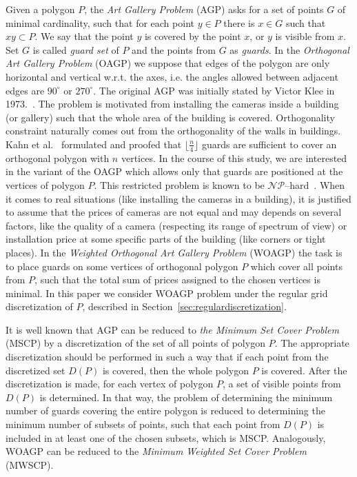\documentclass[runningheads,a4paper]{elsarticle}
\begin{document}
	Given a polygon $P$, the \emph{Art Gallery Problem} (AGP) asks for a set of points $G$ of minimal cardinality,  such that for each point $y \in P$ there is $x \in G$ such that $xy \subset P$. We say that the point $y$ is covered by the point $x$, or $y$ is visible from $x$. Set $G$ is called \emph{guard set} of $P$ and the points from $G$ as \emph{guards}. In the \emph{Orthogonal Art Gallery Problem} (OAGP) we suppose that edges of the polygon are only horizontal and vertical w.r.t. the axes, i.e.  the angles allowed between adjacent edges are  $90^{\circ}$ or $270^{\circ}$. The original AGP was initially stated by Victor  Klee in 1973.~\cite{o1987art}.  The problem is motivated from installing the cameras inside a building (or gallery) such that the whole area of the building is covered. Orthogonality constraint naturally comes out from the orthogonality of the walls in buildings. Kahn et al.~\cite{kahn1983traditional} formulated and proofed that 	$\lfloor \frac{n}{4} \rfloor$ guards are  sufficient to cover an orthogonal polygon with $n$ vertices.      In the course of this study, we are interested in the variant of the OAGP which allows only that guards are positioned at the vertices of polygon $P$. This restricted problem is known to be $\mathcal{NP}$--hard~\cite{katz2008guarding,schuchardt1995two}.  When it comes to real situations (like installing the cameras in a building), it is justified to assume that the prices of cameras are not equal and may depends on several factors, like the quality of a camera   (respecting its range of spectrum of view)  or installation price at some specific parts of the building (like corners or tight places).  In the \emph{Weighted Orthogonal Art Gallery Problem} (WOAGP) the task is to place guards on some vertices of orthogonal polygon $P$ which cover all points from $P$, such that the total sum of prices assigned to the chosen vertices is minimal. In this paper we consider WOAGP problem under the regular grid discretization of $P$, described in Section~\ref{sec:regulardiscretization}.
	
	It is well known that AGP can be reduced to \emph{the Minimum Set Cover Problem} (MSCP) by a discretization of the set of all points of polygon $P$. The appropriate discretization should be performed in such a way that if each point from the discretized set $D(P)$ is covered, then the whole polygon $P$ is covered. After the discretization is made, for each vertex of polygon $P$, a set of visible points from $D(P)$ is determined. In that way, the problem of determining the minimum number of guards covering the entire polygon is reduced to determining the minimum number of subsets of points, such that each point from $D(P)$ is included in at least one of the chosen subsets, which is MSCP. Analogously, WOAGP can be reduced to the \emph{Minimum Weighted  Set Cover Problem} (MWSCP).
	
\end{document}
